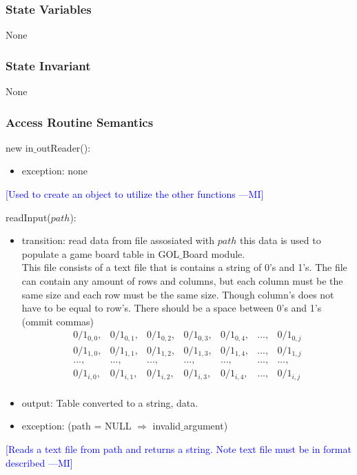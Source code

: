 \documentclass{article}
\newcommand{\authornote}[3]{\textcolor{#1}{[#3 ---#2]}}
\newcommand{\authornote}[3]{}
\newcommand{\wss}[1]{\authornote{blue}{MI}{#1}}
\begin{document}
\subsubsection* {State Variables}

None

\subsubsection* {State Invariant}

None

\subsubsection* {Access Routine Semantics}

new in$\_$outReader():
\begin{itemize}
\item exception: none
\end{itemize}
\wss{Used to create an object to utilize the other functions}

\newpage
\noindent readInput($path$):
\begin{itemize}
\item transition: read data from file assosiated with $path$ this data is used to populate a game board table in GOL$\_$Board module. \\

This file consists of a text file that is contains a string of 0's and 1's. The file can contain any amount of rows and columns, but each column must be the same size and each row must be the same size. Though column's does not have to be equal to row's. There should be a space between 0's and 1's (ommit commas)\\

 \begin{equation}
    \begin{array}{ccccccc}
      0/1_{0,0}, & 0/1_{0,1}, & 0/1_{0,2}, & 0/1_{0,3}, & 0/1_{0,4}, & ..., &0/1_{0,j} \\
      0/1_{1,0}, & 0/1_{1,1}, & 0/1_{1,2}, & 0/1_{1,3}, & 0/1_{1,4}, & ..., &0/1_{1,j} \\
      ..., & ..., & ..., & ..., & ..., & ..., &..., \\
      0/1_{i,0}, & 0/1_{i,1}, & 0/1_{i,2}, & 0/1_{i,3}, & 0/1_{i,4}, & ..., &0/1_{i,j} \\
    \end{array}
  \end{equation}
\item output: Table converted to a string, data.
\item exception: (path = NULL $\Rightarrow$ invalid$\_$argument)
\end{itemize}
\wss{Reads a text file from path and returns a string. Note text file must be in format described}
\end{document}
